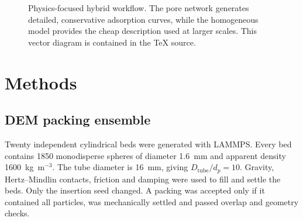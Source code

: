 \documentclass[11pt,a4paper]{article}
\begin{document}
\begin{figure}[!htbp]
\centering
{}
\caption{Physics-focused hybrid workflow. The pore network generates detailed,
conservative adsorption curves, while the homogeneous model provides the cheap
description used at larger scales. This vector diagram is contained in the
TeX source.}
\label{fig:workflow}
\end{figure}

\section{Methods}

\subsection{DEM packing ensemble}

Twenty independent cylindrical beds were generated with LAMMPS. Every bed
contains 1850 monodisperse spheres of diameter 1.6~mm and apparent density
1600~kg~m$^{-3}$. The tube diameter is 16~mm, giving
$D_{\mathrm{tube}}/d_p=10$. Gravity, Hertz--Mindlin contacts, friction and
damping were used to fill and settle the beds. Only the insertion seed changed.
A packing was accepted only if it contained all particles, was mechanically
settled and passed overlap and geometry checks.
\end{document}
